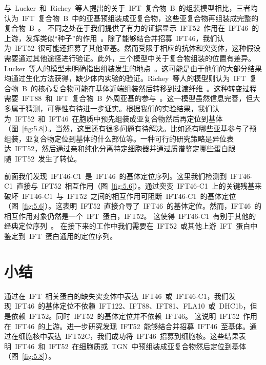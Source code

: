 与\ Lucker\ 和\ Richey\ 等人提出的关于\ IFT\ 复合物\ B\ 的组装模型相比，三者均认为\ IFT\ 复合物\ B\ 中的亚基预组装成亚复合物，这些亚复合物再组装成完整的复合物\ B\ \citep{Lucker2010,Richey2012,Lv2017}。 不同之处在于我们提供了有力的证据显示\ IFT52\ 作用在\ IFT46\ 的上游，发挥类似“种子”的作用\ \citep{Lv2017}。除了能够结合并招募\ IFT46，我们认为\ IFT52\ 很可能还招募了其他亚基。然而受限于相应的抗体和突变体，这种假设需要通过其他途径进行验证。此外，三个模型中关于复合物组装的位置有差异。Lucker\ 等人的模型未明确指出组装发生的地点\ \citep{Lucker2010}。这可能是由于他们的大部分结果均通过生化方法获得，缺少体内实验的验证。Richey\ 等人的模型则认为\ IFT\ 复合物\ B\ 的核心复合物可能在基体近端组装然后转移到过渡纤维\ \citep{Richey2012}。这种转变过程需要\ IFT88\ 和\ IFT\ 复合物\ B\ 外周亚基的参与\ \citep{Richey2012}。这一模型虽然信息完善，但大多属于猜测，可靠性有待进一步证实。根据我们的实验结果，我们认为\ IFT52\ 和\ IFT46\ 在胞质中预先组装成亚复合物然后再定位到基体（图\ \ref{fig:5.8}）。当然，这里还有很多问题有待解决。比如还有哪些亚基参与了预组装，亚复合物定位到基体的什么部位等。一种可行的研究策略是异位表达\ IFT52，然后通过亲和纯化分离特定细胞器并通过质谱鉴定哪些蛋白跟随\ IFT52\ 发生了转位。

前面我们发现\ IFT46-C1\ 是\ IFT46\ 的基体定位序列。这里我们检测到\ IFT46-C1\ 直接与\ IFT52\ 相互作用（图\ \ref{fig:5.6}）。通过突变\ IFT46-C1\ 上的关键残基来破坏\ IFT46-C1\ 与\ IFT52\ 之间的相互作用可阻断\ IFT46-C1\ 的基体定位（图\ \ref{fig:5.6}）。这表明\ IFT52\ 直接介导了\ IFT46\ 的基体定位。然而，IFT46\ 的相互作用对象仍然是一个\ IFT\ 蛋白，IFT52。 这使得\ IFT46-C1\ 有别于其他的经典定位序列\
\citep{Malicki2014,Bhogaraju2013,McIntyre2015,Dishinger2010,Berbari2008,Hurd2011,Santos2014}。 在接下来的工作中我们需要在\ IFT52\ 或其他上游\ IFT\ 蛋白中鉴定到\ IFT\ 蛋白通用的定位序列。

\section{小结}
通过在\ IFT\ 相关蛋白的缺失突变体中表达\ IFT46\ 或\ IFT46-C1，我们发现\ IFT46\ 的基体定位不依赖\ IFT122、IFT88、IFT81、FLA10\ 或\ DHC1b，但是依赖\ IFT52。同时\ IFT52\ 的基体定位并不依赖\ IFT46。 这说明\ IFT52\ 作用在\ IFT46\ 的上游。进一步研究发现\ IFT52\ 能够结合并招募\ IFT46\ 至基体。通过在细胞核中表达\ IFT52C，我们成功将\ IFT46\ 招募到细胞核。这些结果表明\ IFT46\ 和\ IFT52\ 在细胞质或\ TGN\ 中预组装成亚复合物然后定位到基体（图\ \ref{fig:5.8}）。 